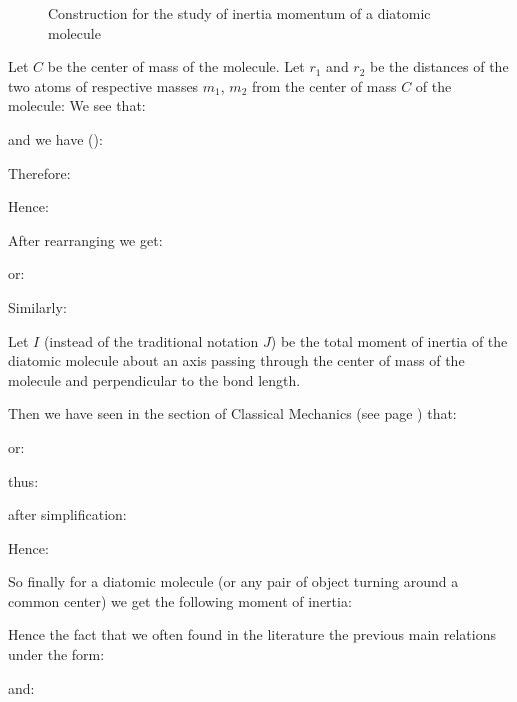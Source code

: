 \begin{figure}[H]
		\vspace*{3mm}	
		\caption{Construction for the study of inertia momentum of a diatomic molecule}
	\end{figure}
	Let $C$ be the center of mass of the molecule. Let $r_1$ and $r_2$ be the distances of the two atoms of respective masses $m_1$, $m_2$ from the center of mass $C$ of the molecule:
	We see that:
	
	and we have ():
	
	Therefore:
	
	Hence:
	
	After rearranging we get:
	
	or:
	
	Similarly:
	
	Let $I$ (instead of the traditional notation $J$) be the total moment of inertia of the diatomic molecule about an axis passing through the center of mass of the molecule and perpendicular to the bond length.

	Then we have seen in the section of Classical Mechanics (see page \pageref{moment of inertia}) that:
	
	or:
	
	thus:
	
	after simplification:
	
	Hence:
	
	So finally for a diatomic molecule (or any pair of object turning around a common center) we get the following moment of inertia:
	
	Hence the fact that we often found in the literature the previous main relations under the form:
	
	and:
	
